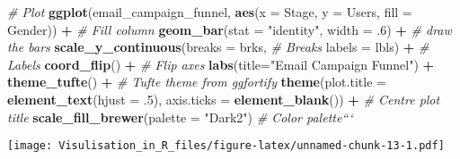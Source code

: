\documentclass[]{article}
\newenvironment{Shaded}{\begin{snugshade}}{\end{snugshade}}
\newcommand{\KeywordTok}[1]{\textcolor[rgb]{0.13,0.29,0.53}{\textbf{#1}}}
\newcommand{\DataTypeTok}[1]{\textcolor[rgb]{0.13,0.29,0.53}{#1}}
\newcommand{\DecValTok}[1]{\textcolor[rgb]{0.00,0.00,0.81}{#1}}
\newcommand{\StringTok}[1]{\textcolor[rgb]{0.31,0.60,0.02}{#1}}
\newcommand{\CommentTok}[1]{\textcolor[rgb]{0.56,0.35,0.01}{\textit{#1}}}
\newcommand{\OperatorTok}[1]{\textcolor[rgb]{0.81,0.36,0.00}{\textbf{#1}}}
\newcommand{\NormalTok}[1]{#1}
\begin{document}
\begin{Shaded}
\begin{Highlighting}[]
\CommentTok{# Plot}
\KeywordTok{ggplot}\NormalTok{(email_campaign_funnel, }\KeywordTok{aes}\NormalTok{(}\DataTypeTok{x =}\NormalTok{ Stage, }\DataTypeTok{y =}\NormalTok{ Users, }\DataTypeTok{fill =}\NormalTok{ Gender)) }\OperatorTok{+}\StringTok{   }\CommentTok{# Fill column}
\StringTok{                              }\KeywordTok{geom_bar}\NormalTok{(}\DataTypeTok{stat =} \StringTok{"identity"}\NormalTok{, }\DataTypeTok{width =}\NormalTok{ .}\DecValTok{6}\NormalTok{) }\OperatorTok{+}\StringTok{   }\CommentTok{# draw the bars}
\StringTok{                              }\KeywordTok{scale_y_continuous}\NormalTok{(}\DataTypeTok{breaks =}\NormalTok{ brks,   }\CommentTok{# Breaks}
                                                 \DataTypeTok{labels =}\NormalTok{ lbls) }\OperatorTok{+}\StringTok{ }\CommentTok{# Labels}
\StringTok{                              }\KeywordTok{coord_flip}\NormalTok{() }\OperatorTok{+}\StringTok{  }\CommentTok{# Flip axes}
\StringTok{                              }\KeywordTok{labs}\NormalTok{(}\DataTypeTok{title=}\StringTok{"Email Campaign Funnel"}\NormalTok{) }\OperatorTok{+}
\StringTok{                              }\KeywordTok{theme_tufte}\NormalTok{() }\OperatorTok{+}\StringTok{  }\CommentTok{# Tufte theme from ggfortify}
\StringTok{                              }\KeywordTok{theme}\NormalTok{(}\DataTypeTok{plot.title =} \KeywordTok{element_text}\NormalTok{(}\DataTypeTok{hjust =}\NormalTok{ .}\DecValTok{5}\NormalTok{), }
                                    \DataTypeTok{axis.ticks =} \KeywordTok{element_blank}\NormalTok{()) }\OperatorTok{+}\StringTok{   }\CommentTok{# Centre plot title}
\StringTok{                              }\KeywordTok{scale_fill_brewer}\NormalTok{(}\DataTypeTok{palette =} \StringTok{"Dark2"}\NormalTok{)  }\CommentTok{# Color palette```}
\end{Highlighting}
\end{Shaded}

\texttt{[image: Visulisation\_in\_R\_files/figure-latex/unnamed-chunk-13-1.pdf]}
\end{document}
